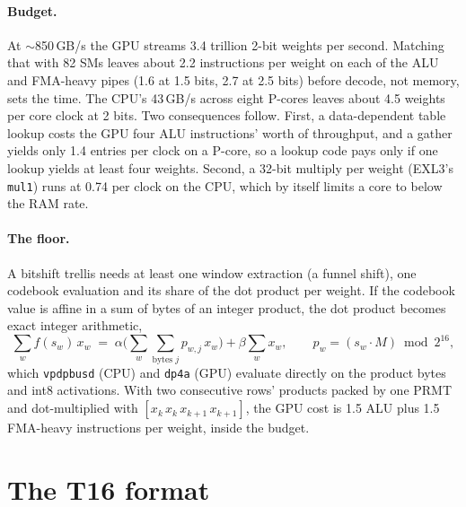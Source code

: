 \documentclass[10pt]{article}
\begin{document}
\paragraph{Budget.}
At $\sim$850\,GB/s the GPU streams 3.4 trillion 2-bit weights per second. Matching that with 82 SMs leaves about 2.2
instructions per weight on each of the ALU and FMA-heavy pipes (1.6 at 1.5 bits, 2.7 at 2.5 bits) before decode, not
memory, sets the time. The CPU's 43\,GB/s across eight P-cores leaves about 4.5 weights per core clock at 2 bits.
Two consequences follow. First, a data-dependent table lookup costs the GPU four ALU instructions' worth of throughput,
and a gather yields only 1.4 entries per clock on a P-core, so a lookup code pays only if one lookup yields at least
four weights. Second, a 32-bit multiply per weight (EXL3's \texttt{mul1}) runs at 0.74 per clock on the CPU, which by
itself limits a core to below the RAM rate.

\paragraph{The floor.}
A bitshift trellis needs at least one window extraction (a funnel shift), one codebook evaluation and its share of the
dot product per weight. If the codebook value is affine in a sum of bytes of an integer product, the dot product
becomes exact integer arithmetic,
\begin{equation}
\sum_w f(s_w)\, x_w \;=\; \alpha \Big(\sum_w \textstyle\sum_{\text{bytes } j} p_{w,j}\, x_w\Big) + \beta \sum_w x_w,
\qquad p_w = (s_w \cdot M) \bmod 2^{16},
\label{eq:fused}
\end{equation}
which \texttt{vpdpbusd} (CPU) and \texttt{dp4a} (GPU) evaluate directly on the product bytes and int8 activations. With
two consecutive rows' products packed by one PRMT and dot-multiplied with $[x_k\, x_k\, x_{k+1}\, x_{k+1}]$, the GPU cost
is 1.5 ALU plus 1.5 FMA-heavy instructions per weight, inside the budget.

\section{The T16 format}
\label{sec:format}
\end{document}
